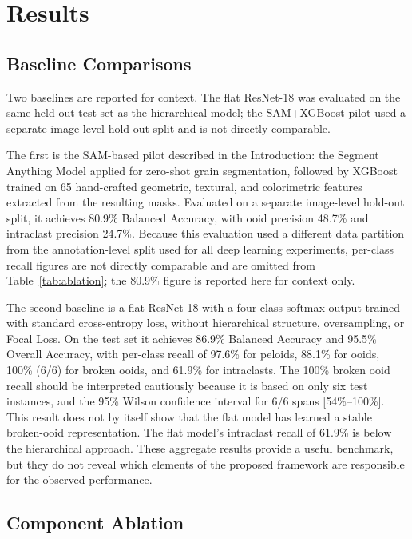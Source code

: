 \documentclass[a4paper,fleqn]{cas-dc}
\begin{document}
\section{Results}

\subsection{Baseline Comparisons}

Two baselines are reported for context. The flat ResNet-18 was evaluated on the same held-out test set as the hierarchical model; the SAM+XGBoost pilot used a separate image-level hold-out split and is not directly comparable.

 The first is the SAM-based pilot described in the Introduction: the Segment Anything Model \citep{kirillov2023sam} applied for zero-shot grain segmentation, followed by XGBoost \citep{chen2016xgboost} trained on 65 hand-crafted geometric, textural, and colorimetric features extracted from the resulting masks. Evaluated on a separate image-level hold-out split, it achieves 80.9\% Balanced Accuracy, with ooid precision 48.7\% and intraclast precision 24.7\%. Because this evaluation used a different data partition from the annotation-level split used for all deep learning experiments, per-class recall figures are not directly comparable and are omitted from Table~\ref{tab:ablation}; the 80.9\% figure is reported here for context only.

The second baseline is a flat ResNet-18 with a four-class softmax output trained with standard cross-entropy loss, without hierarchical structure, oversampling, or Focal Loss. On the test set it achieves 86.9\% Balanced Accuracy and 95.5\% Overall Accuracy, with per-class recall of 97.6\% for peloids, 88.1\% for ooids, 100\% (6/6) for broken ooids, and 61.9\% for intraclasts. The 100\% broken ooid recall should be interpreted cautiously because it is based on only six test instances, and the 95\% Wilson confidence interval for 6/6 spans [54\%--100\%]. This result does not by itself show that the flat model has learned a stable broken-ooid representation. The flat model's intraclast recall of 61.9\% is below the hierarchical approach. These aggregate results provide a useful benchmark, but they do not reveal which elements of the proposed framework are responsible for the observed performance.

\subsection{Component Ablation}
\label{sec:results_ablation}
\end{document}
